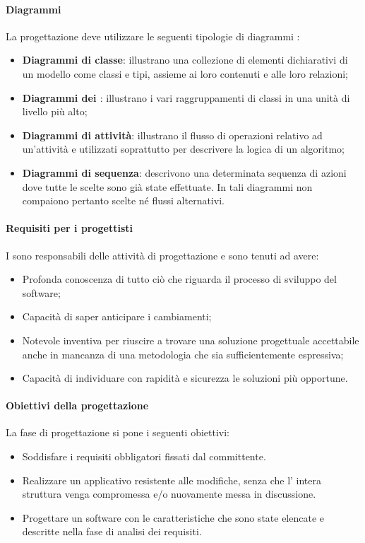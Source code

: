 \paragraph{Diagrammi}
La progettazione deve utilizzare le seguenti tipologie di diagrammi :
\begin{itemize}
\item
\textbf{Diagrammi di classe}: illustrano una collezione di elementi dichiarativi di un modello come classi e tipi, assieme ai loro contenuti e alle loro relazioni;
\item
\textbf{Diagrammi dei \textit{}}: illustrano i vari raggruppamenti di classi in una unità di livello più alto;
\item
\textbf{Diagrammi di attività}: illustrano il flusso di operazioni relativo ad un'attività e utilizzati soprattutto per descrivere la logica di un algoritmo;
\item
\textbf{Diagrammi di sequenza}: descrivono una determinata sequenza di azioni dove tutte le scelte sono già state effettuate. In tali diagrammi non compaiono pertanto scelte né flussi alternativi.
\end{itemize}

\paragraph{Requisiti per i progettisti}
I \textit{\ProgP} sono responsabili delle attività di progettazione e sono tenuti ad avere:
\begin{itemize}
\item
Profonda conoscenza di tutto ciò che riguarda il processo di sviluppo del software;
\item
Capacità di saper anticipare i cambiamenti;
\item
Notevole inventiva per riuscire a trovare una soluzione progettuale accettabile anche in mancanza di una metodologia che sia sufficientemente espressiva;
\item
Capacità di individuare con rapidità e sicurezza le soluzioni più opportune.
\end{itemize}

\paragraph{Obiettivi della progettazione}
La fase di progettazione si pone i seguenti obiettivi:
\begin{itemize}
\item Soddisfare i requisiti obbligatori fissati dal committente.
\item Realizzare un applicativo  resistente alle modifiche, senza che l' intera struttura venga compromessa e/o nuovamente messa in discussione.
\item Progettare un software con le caratteristiche che sono state elencate e descritte nella fase di analisi dei requisiti.
\end{itemize}


